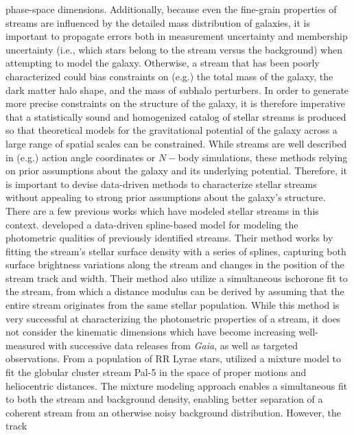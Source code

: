 \documentclass[twocolumn]{aastex631}
\begin{document}
    phase-space dimensions. Additionally, because even the fine-grain properties
    of streams are influenced by the detailed mass distribution of galaxies, it
    is important to propagate errors both in measurement uncertainty and
    membership uncertainty (i.e., which stars belong to the stream versus the
    background) when attempting to model the galaxy. Otherwise, a stream that
    has been poorly characterized could bias constraints on (e.g.) the total
    mass of the galaxy, the dark matter halo shape, and the mass of subhalo
    perturbers. In order to generate more precise constraints on the structure
    of the galaxy, it is therefore imperative that a statistically sound and
    homogenized catalog of stellar streams is produced so that theoretical
    models for the gravitational potential of the galaxy across a large range of
    spatial scales can be constrained. 
    While streams are well described in (e.g.) action angle coordinates or
    $N-$body simulations, these methods relying on prior assumptions about the
    galaxy and its underlying potential. Therefore, it is important to devise
    data-driven methods to characterize stellar streams without appealing to
    strong prior assumptions about the galaxy's structure. 
    There are a few previous works which have modeled stellar streams in this
    context. \citet{2022MNRAS.514.1757P} developed a data-driven spline-based
    model for modeling the photometric qualities of previously identified
    streams. Their method works by fitting the stream's stellar surface density
    with a series of splines, capturing both surface brightness variations along
    the stream and changes in the position of the stream track and width. Their
    method also utilize a simultaneous ischorone fit to the stream, from which a
    distance modulus can be derived by assuming that the entire stream
    originates from the same stellar population. While this method is very
    successful at characterizing the photometric properties of a stream, it does
    not consider the kinematic dimensions which have become increasing
    well-measured with successive data releases from {\it Gaia}, as well as
    targeted observations. From a population of RR Lyrae stars,
    \citet{2019AJ....158..223P} utilized a mixture model to fit the globular
    cluster stream Pal-5 in the space of proper motions and heliocentric
    distances. The mixture modeling approach enables a simultaneous fit to both
    the stream and background density, enabling better separation of a coherent
    stream from an otherwise noisy background distribution. However, the track
\end{document}
